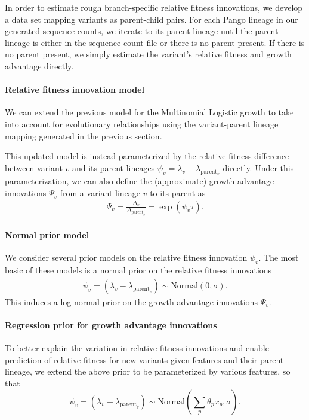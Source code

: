 In order to estimate rough branch-specific relative fitness innovations, we develop a data set mapping variants as parent-child pairs.
For each Pango lineage in our generated sequence counts, we iterate to its parent lineage until the parent lineage is either in the sequence count file or there is no parent present.
If there is no parent present, we simply estimate the variant's relative fitness and growth advantage directly.

\paragraph{Relative fitness innovation model}%

We can extend the previous model for the Multinomial Logistic growth to take into account for evolutionary relationships using the variant-parent lineage mapping generated in the previous section.

This updated model is instead parameterized by the relative fitness difference between variant $v$ and its parent lineages $\psi_{v} = \lambda_{v} - \lambda_{\text{parent}_{v}}$ directly.
Under this parameterization, we can also define the (approximate) growth advantage innovations $\Psi_{v}$ from a variant lineage $v$ to its parent as
\begin{align*}
\Psi_{v} = \frac{\Delta_{v}}{\Delta_{\text{parent}_{v}}} = \exp(\psi_{v} \tau).
\end{align*}

\paragraph{Normal prior model}%

We consider several prior models on the relative fitness innovation $\psi_{v}$.
The most basic of these models is a normal prior on the relative fitness innovations
\begin{align*}
    \psi_{v} = (\lambda_{v} - \lambda_{\text{parent}_{v}}) \sim \text{Normal}(0, \sigma).
\end{align*}
This induces a log normal prior on the growth advantage innovations $\Psi_{v}$.

\paragraph{Regression prior for growth advantage innovations}%

To better explain the variation in relative fitness innovations and enable prediction of relative fitness for new variants given features and their parent lineage, we extend the above prior to be parameterized by various features, so that
\begin{equation}\label{eq:relative_fitness_regression}
    \psi_{v} = (\lambda_{v} - \lambda_{\text{parent}_{v}}) \sim \text{Normal} \left( \sum_{p} \theta_{p} x_{p}, \sigma \right).
\end{equation}


